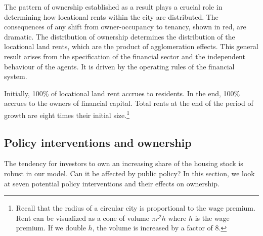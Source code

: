 The pattern of ownership established as a result plays a crucial role in determining how locational rents within the city are distributed. The consequences of any shift from owner-occupancy to tenancy, shown in red, are dramatic. 
The distribution of ownership determines the distribution of the locational land rents, which are the product of agglomeration effects. This general result arises from the specification of the financial sector and the independent behaviour of the agents. It is driven by the operating rules of the financial system. 

Initially, 100\% of locational land rent accrues to residents. In the end, 100\% accrues to the owners of financial capital. Total rents at the end of the period of growth are eight times their initial size.\footnote{Recall that the radius of a circular city is proportional to the wage premium. Rent can be visualized as a cone of volume $\pi r^2 h$ where $h$ is the wage premium. If we double $h$, the volume is increased by a factor of 8.}



\subsection{Policy interventions and ownership}
The tendency for investors to own an increasing share of the housing stock is robust in our model. Can it be affected by public policy? In this section, we look at seven potential policy interventions and their effects on ownership. 

